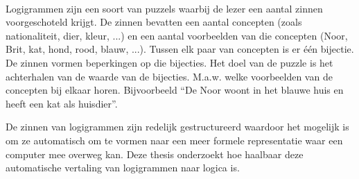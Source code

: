 \paragraph{} Logigrammen zijn een soort van puzzels waarbij de lezer een aantal zinnen voorgeschoteld krijgt. De zinnen bevatten een aantal concepten (zoals nationaliteit, dier, kleur, ...) en een aantal voorbeelden van die concepten (Noor, Brit, kat, hond, rood, blauw, ...). Tussen elk paar van concepten is er één bijectie. De zinnen vormen beperkingen op die bijecties. Het doel van de puzzle is het achterhalen van de waarde van de bijecties. M.a.w. welke voorbeelden van de concepten bij elkaar horen. Bijvoorbeeld ``De Noor woont in het blauwe huis en heeft een kat als huisdier''.

De zinnen van logigrammen zijn redelijk gestructureerd waardoor het mogelijk is om ze automatisch om te vormen naar een meer formele representatie waar een computer mee overweg kan. Deze thesis onderzoekt hoe haalbaar deze automatische vertaling van logigrammen naar logica is.
